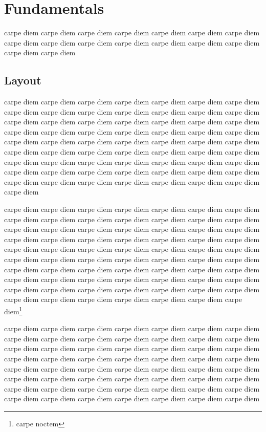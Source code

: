 \chapter{Fundamentals}

carpe diem carpe diem carpe diem carpe diem carpe diem carpe diem carpe diem carpe diem 
carpe diem carpe diem carpe diem carpe diem carpe diem carpe diem carpe diem carpe diem 

\section{Layout}

carpe diem carpe diem carpe diem carpe diem carpe diem carpe diem carpe diem carpe diem 
carpe diem carpe diem carpe diem carpe diem carpe diem carpe diem carpe diem carpe diem 
carpe diem carpe diem carpe diem carpe diem carpe diem carpe diem carpe diem carpe diem 
carpe diem carpe diem carpe diem carpe diem carpe diem carpe diem carpe diem carpe diem 
carpe diem carpe diem carpe diem carpe diem carpe diem carpe diem carpe diem carpe diem 
carpe diem carpe diem carpe diem carpe diem carpe diem carpe diem carpe diem carpe diem 
carpe diem carpe diem carpe diem carpe diem carpe diem carpe diem carpe diem carpe diem 
carpe diem carpe diem carpe diem carpe diem carpe diem carpe diem carpe diem carpe diem 


carpe diem carpe diem carpe diem carpe diem carpe diem carpe diem carpe diem carpe diem 
carpe diem carpe diem carpe diem carpe diem carpe diem carpe diem carpe diem carpe diem 
carpe diem carpe diem carpe diem carpe diem carpe diem carpe diem carpe diem carpe diem 
carpe diem carpe diem carpe diem carpe diem carpe diem carpe diem carpe diem carpe diem 
carpe diem carpe diem carpe diem carpe diem carpe diem carpe diem carpe diem carpe diem 
carpe diem carpe diem carpe diem carpe diem carpe diem carpe diem carpe diem carpe diem 
carpe diem carpe diem carpe diem carpe diem carpe diem carpe diem carpe diem carpe diem 
carpe diem carpe diem carpe diem carpe diem carpe diem carpe diem carpe diem carpe diem 
carpe diem carpe diem carpe diem carpe diem carpe diem carpe diem\footnote{carpe noctem}

carpe diem carpe diem carpe diem carpe diem carpe diem carpe diem carpe diem carpe diem 
carpe diem carpe diem carpe diem carpe diem carpe diem carpe diem carpe diem carpe diem 
carpe diem carpe diem carpe diem carpe diem carpe diem carpe diem carpe diem carpe diem 
carpe diem carpe diem carpe diem carpe diem carpe diem carpe diem carpe diem carpe diem 
carpe diem carpe diem carpe diem carpe diem carpe diem carpe diem carpe diem carpe diem 
carpe diem carpe diem carpe diem carpe diem carpe diem carpe diem carpe diem carpe diem 
carpe diem carpe diem carpe diem carpe diem carpe diem carpe diem carpe diem carpe diem 



